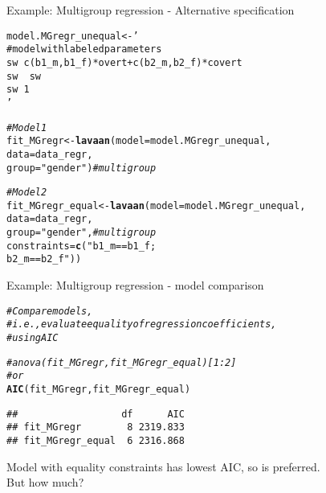 \documentclass[10pt]{beamer}\usepackage[]{graphicx}\usepackage[]{xcolor}
\makeatletter
\newcommand{\hlsng}[1]{\textcolor[rgb]{0.192,0.494,0.8}{#1}}%
\newcommand{\hlcom}[1]{\textcolor[rgb]{0.678,0.584,0.686}{\textit{#1}}}%
\newcommand{\hldef}[1]{\textcolor[rgb]{0.345,0.345,0.345}{#1}}%
\newcommand{\hlkwb}[1]{\textcolor[rgb]{0.69,0.353,0.396}{#1}}%
\newcommand{\hlkwc}[1]{\textcolor[rgb]{0.333,0.667,0.333}{#1}}%
\newcommand{\hlkwd}[1]{\textcolor[rgb]{0.737,0.353,0.396}{\textbf{#1}}}%
\newenvironment{kframe}{%
 \def\at@end@of@kframe{}%
 \ifinner\ifhmode%
  \def\at@end@of@kframe{\end{minipage}}%
  \begin{minipage}{\columnwidth}%
 \fi\fi%
 \def\FrameCommand##1{\hskip\@totalleftmargin \hskip-\fboxsep
 \colorbox{shadecolor}{##1}\hskip-\fboxsep
     \hskip-\linewidth \hskip-\@totalleftmargin \hskip\columnwidth}%
 \MakeFramed {\advance\hsize-\width
   \@totalleftmargin\z@ \linewidth\hsize
   \@setminipage}}%
 {\par\unskip\endMakeFramed%
 \at@end@of@kframe}
\newenvironment{knitrout}{}{} %
\makeatother
\begin{document}
%
\begin{frame}[fragile]{Example: Multigroup regression - Alternative specification}

\begin{knitrout}
\color{fgcolor}\begin{kframe}
\begin{alltt}
\hldef{model.MGregr_unequal} \hlkwb{<-} \hlsng{'
  # model with labeled parameters
  sw ~ c(b1_m,b1_f)*overt + c(b2_m,b2_f)*covert 
  sw ~~ sw                                      
  sw ~ 1                                        
'}

\hlcom{# Model 1}
\hldef{fit_MGregr} \hlkwb{<-} \hlkwd{lavaan}\hldef{(}\hlkwc{model} \hldef{= model.MGregr_unequal,}
                    \hlkwc{data} \hldef{= data_regr,}
                    \hlkwc{group} \hldef{=} \hlsng{"gender"}\hldef{)} \hlcom{# multigroup}

\hlcom{# Model 2}
\hldef{fit_MGregr_equal} \hlkwb{<-} \hlkwd{lavaan}\hldef{(}\hlkwc{model} \hldef{= model.MGregr_unequal,}
                    \hlkwc{data} \hldef{= data_regr,}
                    \hlkwc{group} \hldef{=} \hlsng{"gender"}\hldef{,} \hlcom{# multigroup}
                    \hlkwc{constraints} \hldef{=} \hlkwd{c}\hldef{(}\hlsng{"b1_m == b1_f; 
                                    b2_m == b2_f"}\hldef{))}
\end{alltt}
\end{kframe}
\end{knitrout}
          
\end{frame}
%
\begin{frame}[fragile]{Example: Multigroup regression - model comparison}

\begin{knitrout}
\color{fgcolor}\begin{kframe}
\begin{alltt}
\hlcom{# Compare models, }
\hlcom{# i.e., evaluate equality of regression coefficients,}
\hlcom{# using AIC}

\hlcom{#anova(fit_MGregr, fit_MGregr_equal)[1:2] }
\hlcom{# or}
\hlkwd{AIC}\hldef{(fit_MGregr, fit_MGregr_equal)}
\end{alltt}
\begin{verbatim}
##                  df      AIC
## fit_MGregr        8 2319.833
## fit_MGregr_equal  6 2316.868
\end{verbatim}
\end{kframe}
\end{knitrout}

Model with equality constraints has lowest AIC, so is preferred.\\
But how much?

\end{frame}
\end{document}
